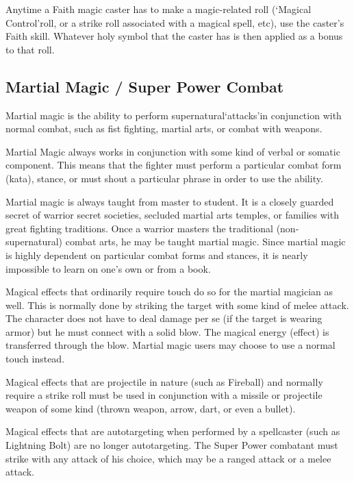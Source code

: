 \documentclass[twoside]{book}
\begin{document}
    {  
    Anytime a Faith magic caster has to make a magic-related roll (`Magical Control'roll, or a strike roll associated with a magical spell, etc), use the caster's Faith skill. Whatever holy symbol that the caster has is then applied as a bonus to that roll.
    }
  
    

\subsection{Martial Magic / Super Power Combat}
    
    {  
    Martial magic is the ability to perform supernatural`attacks'in conjunction with normal combat, such as fist fighting, martial arts, or combat with weapons.
    }
  
    {  
    Martial Magic always works in conjunction with some kind of verbal or somatic component. This means that the fighter must perform a particular combat form (kata), stance, or must shout a particular phrase in order to use the ability.
    }
  
    {  
    Martial magic is always taught from master to student. It is a closely guarded secret of warrior secret societies, secluded martial arts temples, or families with great fighting traditions. Once a warrior masters the traditional (non-supernatural) combat arts, he may be taught martial magic. Since martial magic is highly dependent on particular combat forms and stances, it is nearly impossible to learn on one's own or from a book.
    }
  
    {  
    Magical effects that ordinarily require touch do so for the martial magician as well. This is normally done by striking the target with some kind of melee attack. The character does not have to deal damage per se (if the target is wearing armor) but he must connect with a solid blow. The magical energy (effect) is transferred through the blow. Martial magic users may choose to use a normal touch instead.
    }
  
    {  
    Magical effects that are projectile in nature (such as Fireball) and normally require a strike roll must be used in conjunction with a missile or projectile weapon of some kind (thrown weapon, arrow, dart, or even a bullet).
    }
  
    {  
    Magical effects that are autotargeting when performed by a spellcaster (such as Lightning Bolt) are no longer autotargeting. The Super Power combatant must strike with any attack of his choice, which may be a ranged attack or a melee attack.
    }
  
\end{document}
